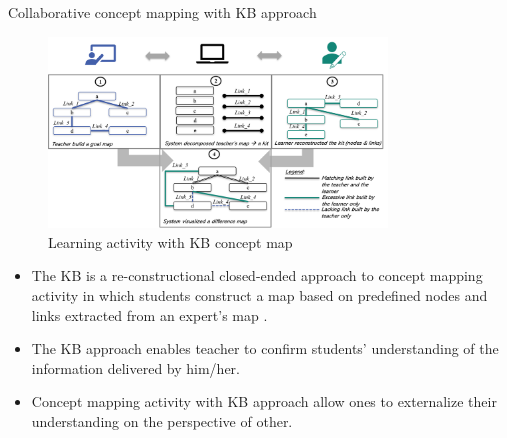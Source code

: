 \begin{frame}[allowframebreaks]{Collaborative concept mapping with KB approach}

    \begin{figure}[tb]
        \begin{center}
            \includegraphics[width=90mm]{images/kb_flow.png}
        \end{center}
        \caption{Learning activity with KB concept map}
        \label{intro::kbmap}
    \end{figure}
    
    \begin{itemize}
        \item The KB is a re-constructional closed-ended approach to concept mapping
        activity in which students construct a map based on predefined nodes and
        links extracted from an expert's map \cite{Hirashima2015,Hirashima2019ReconstructionalReconstruction}. 
        \item The KB approach enables teacher to confirm students' understanding
        of the information delivered by him/her. 
        \item Concept mapping activity with KB approach allow ones to externalize 
        their understanding on the perspective of other.

    \end{itemize}
\end{frame}


